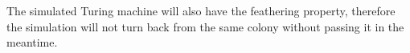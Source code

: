 \documentclass[11pt]{memoir}
\theoremstyle{definition} %
\newcommand{\fld}[1]{\ensuremath{\textit{#1\/}}}
\newcommand{\tNormal}{e_{\mathrm{normal}}}
\newcommand{\tZig}{e_{\mathrm{zig}}}
\newcommand{\tHeal}{e_{\mathrm{heal}}}
\newcommand{\tRebuild}{e_{\mathrm{rebuild}}}
\newcommand{\f}{f}
\newcommand{\F}{F}
\newcommand{\V}{V}
\newcommand{\Z}{Z}
\newcommand{\Addr}{\fld{Addr}}
\newcommand{\PadLen}{\mathit{PadLen}}
\begin{document}
The simulated Turing machine will also have the feathering property,
therefore the simulation will not turn back 
from the same colony without passing it in the meantime.





\end{document}
